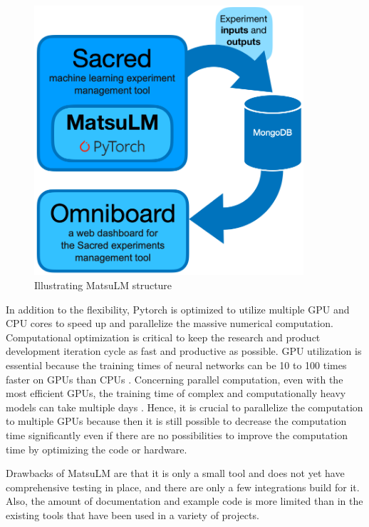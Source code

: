 \begin{figure}[!htbp]
    \centering
    \includegraphics[width=10cm,height=\textheight,keepaspectratio]{matsu_lm}
    \caption{Illustrating MatsuLM structure}
    \label{fig:matsu_lm}
\end{figure}

In addition to the flexibility, Pytorch is optimized to utilize multiple GPU and CPU cores to speed up and parallelize the massive numerical computation. Computational optimization is critical to keep the research and product development iteration cycle as fast and productive as possible. GPU utilization is essential because the training times of neural networks can be 10 to 100 times faster on GPUs than CPUs \parencite{chen2014efficient,colic2010exploring}. Concerning parallel computation, even with the most efficient GPUs, the training time of complex and computationally heavy models can take multiple days \parencite{you2019large}. Hence, it is crucial to parallelize the computation to multiple GPUs because then it is still possible to decrease the computation time significantly even if there are no possibilities to improve the computation time by optimizing the code or hardware.

Drawbacks of MatsuLM are that it is only a small tool and does not yet have comprehensive testing in place, and there are only a few integrations build for it. Also, the amount of documentation and example code is more limited than in the existing tools that have been used in a variety of projects.

